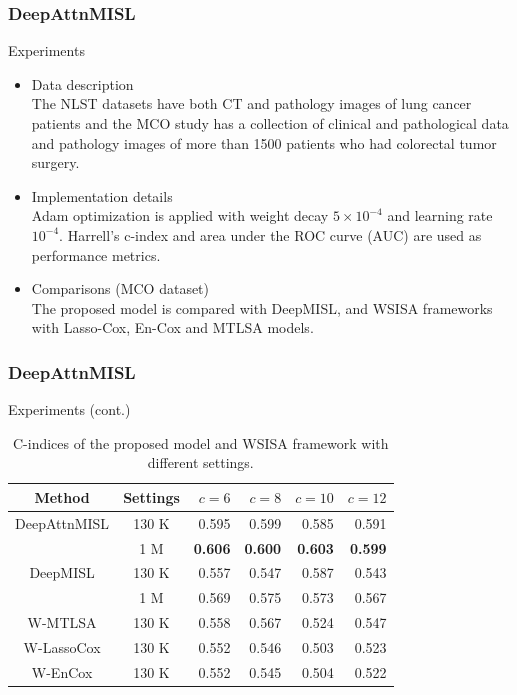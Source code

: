 \documentclass{beamer}
\begin{document}
	\begin{frame}
		\frametitle{DeepAttnMISL}
		Experiments
		
		\begin{itemize}
			\item Data description \\
			\vspace{5mm}
			The NLST datasets have both CT and pathology images of lung cancer patients and the MCO study has a collection of clinical and pathological data and pathology images of more than 1500 patients who had colorectal tumor surgery.
			\item Implementation details \\
			\vspace{5mm}
			Adam  optimization is applied with weight decay $5 \times 10^{ -4 }$ and learning rate $10^{ -4 }$. Harrell's c-index and area under the ROC curve (AUC) are used as performance metrics.
			\item Comparisons (MCO dataset) \\
			\vspace{5mm}
			The proposed model is compared with DeepMISL, and WSISA frameworks with Lasso-Cox, En-Cox and MTLSA models.
		\end{itemize}
	\end{frame}
	
	\begin{frame}
		\frametitle{DeepAttnMISL}
		Experiments (cont.)
		
		\begin{table}[H]
			\begin{center}
				\begin{tabular}{ c c r r r r }
					\hline
					Method & Settings & $c = 6$ & $c = 8$ & $c = 10$ & $c = 12$ \\
					\hline
					DeepAttnMISL & 130 K & 0.595 & 0.599 & 0.585 & 0.591 \\ 
					& 1 M & \textbf{0.606} & \textbf{0.600} & \textbf{0.603} & \textbf{0.599} \\
					DeepMISL & 130 K & 0.557 & 0.547 & 0.587 &	0.543 \\
					& 1 M & 0.569 & 0.575 & 0.573 & 0.567 \\
					W-MTLSA & 130 K & 0.558 & 0.567 & 0.524 & 0.547 \\
					W-LassoCox & 130 K & 0.552 & 0.546 & 0.503 & 0.523 \\
					W-EnCox & 130 K & 0.552 & 0.545 & 0.504 & 0.522 \\
					\hline
				\end{tabular}
			\end{center}
			\caption{C-indices of the proposed model and WSISA framework with different settings.}
		\end{table} 
		
	\end{frame}
	
\end{document}
